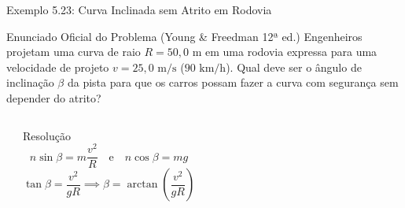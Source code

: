 \documentclass[10pt,aspectratio=169]{beamer}
\begin{document}
\begin{frame}{Exemplo 5.23: Curva Inclinada sem Atrito em Rodovia}
    \begin{block}{Enunciado Oficial do Problema (Young \& Freedman 12ª ed.)}
        \small
        Engenheiros projetam uma curva de raio $R = 50{,}0\text{ m}$ em uma rodovia expressa para uma velocidade de projeto $v = 25{,}0\text{ m/s}$ ($90\text{ km/h}$). Qual deve ser o ângulo de inclinação $\beta$ da pista para que os carros possam fazer a curva com segurança sem depender do atrito?
    \end{block}
    \begin{columns}[T]
        \begin{center}
        \end{center}
        \begin{exampleblock}{Resolução}
            \small
            $$n \sin\beta = m \frac{v^2}{R} \quad \text{e} \quad n \cos\beta = mg$$
            $$\tan\beta = \frac{v^2}{gR} \implies \beta = \arctan\left(\frac{v^2}{gR}\right)$$
        \end{exampleblock}
    \end{columns}
\end{frame}
\end{document}
